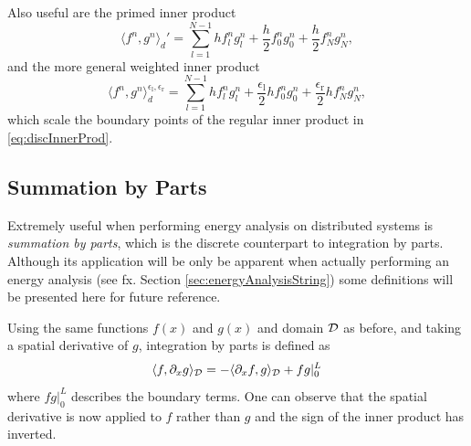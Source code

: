 Also useful are the primed inner product
\begin{equation}\label{eq:primedInnerProd}
    \langle f^n, g^n \rangle_d' = \sum_{l=1}^{N-1} h f_l^n g_l^n + \frac{h}{2}f_0^ng_0^n + \frac{h}{2}f_N^ng_N^n,
\end{equation}
and the more general weighted inner product
\begin{equation}\label{eq:weightedInnerProd}
    \langle f^n, g^n \rangle_d^{\epsilon_\text{l}, \epsilon_\text{r}} = \sum_{l=1}^{N-1} h f_l^n g_l^n + \frac{\epsilon_\text{l}}{2}hf_0^ng_0^n + \frac{\epsilon_\text{r}}{2}hf_N^ng_N^n,
\end{equation}
which scale the boundary points of the regular inner product in \eqref{eq:discInnerProd}. 

\subsection{Summation by Parts}
Extremely useful when performing energy analysis on distributed systems is \textit{summation by parts}, which is the discrete counterpart to integration by parts. Although its application will be only be apparent when actually performing an energy analysis (see fx. Section \ref{sec:energyAnalysisString}) some definitions will be presented here for future reference.

Using the same functions $f(x)$ and $g(x)$ and domain $\mathcal{D}$ as before, and taking a spatial derivative of $g$, integration by parts is defined as
\begin{equation}
    \langle f, \partial_x g \rangle_{\mathcal{D}} = -\langle \partial_x f, g\rangle_{\mathcal{D}} + fg|_0^L
\end{equation}
where $fg|_0^L$ describes the boundary terms. One can observe that the spatial derivative is now applied to $f$ rather than $g$ and the sign of the inner product has inverted. 

